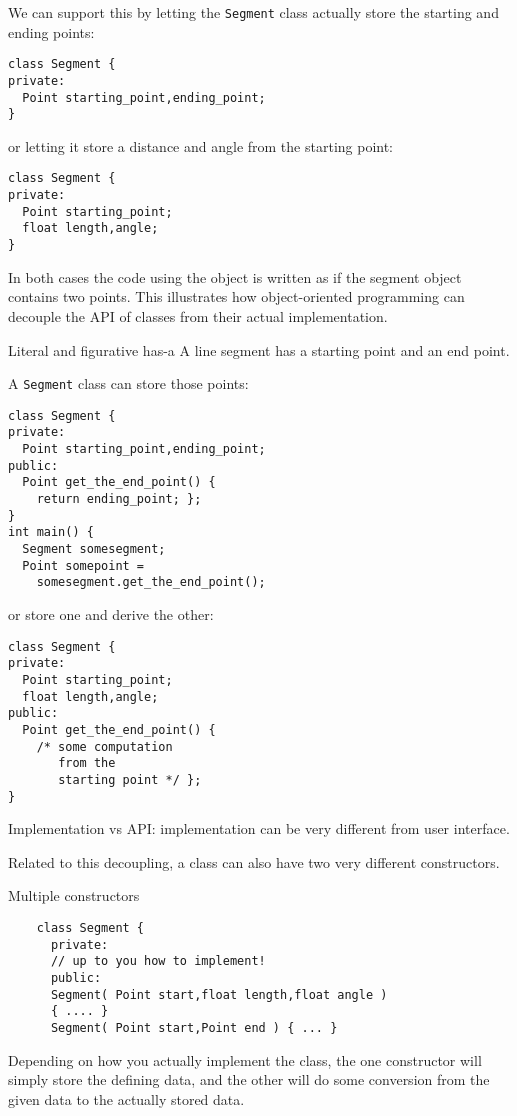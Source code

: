 We can support this by letting the \lstinline{Segment} class
actually store the starting and ending points:
\begin{lstlisting}
class Segment {
private:
  Point starting_point,ending_point;
}
\end{lstlisting}
or letting it store a distance and angle from the starting point:
\begin{lstlisting}
class Segment {
private:
  Point starting_point;
  float length,angle;
}
\end{lstlisting}
In both cases the code using the object is written as if the segment
object contains two points.
This illustrates how object-oriented programming can decouple the
\ac{API} of classes from their actual implementation.

\begin{slide}{Literal and figurative has-a}
  \label{sl:obj-hasa-ish}
\small
  A line segment has a starting point and an end point.
\begin{multicols}{2}
  A \lstinline{Segment}
  class can store those points:
\begin{lstlisting}
class Segment {
private:
  Point starting_point,ending_point;
public:
  Point get_the_end_point() {
    return ending_point; };
}
int main() {
  Segment somesegment;
  Point somepoint =
    somesegment.get_the_end_point();
\end{lstlisting}
\columnbreak
or store one and derive the other:
\begin{lstlisting}
class Segment {
private:
  Point starting_point;
  float length,angle;
public:
  Point get_the_end_point() {
    /* some computation
       from the
       starting point */ };
}
\end{lstlisting}
\vfill\hbox{}
\end{multicols}
Implementation vs API: implementation can be very different from user interface.
\end{slide}

Related to this decoupling, a class can also have two very different constructors.
\begin{block}{Multiple constructors}
  \label{sl:segment-constructors}
  \begin{lstlisting}
    class Segment {
      private:
      // up to you how to implement!
      public:
      Segment( Point start,float length,float angle )
      { .... }
      Segment( Point start,Point end ) { ... }
  \end{lstlisting}
  Depending on how you actually implement the class, the one constructor
  will simply store the defining data, and the other will do some
  conversion from the given data to the actually stored data.
\end{block}

